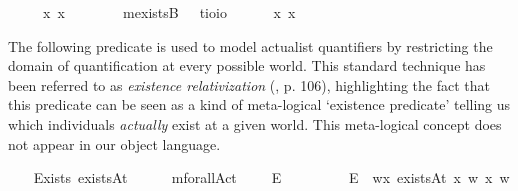 \begin{isabellebody}
\isanewline
\ \ \ \ \ {\isachardoublequoteopen}\isactrlbold {\isasymforall}x{\isachardot}\ {\isasymphi}{\isacharparenleft}x{\isacharparenright}\ {\isasymequiv}\ \isactrlbold {\isasymforall}{\isasymphi}{\isachardoublequoteclose}\ \ \isanewline
\ \ \isamarkupfalse%
\ mexistsB\ \ {\isacharcolon}{\isacharcolon}\ {\isachardoublequoteopen}{\isacharparenleft}{\isacharprime}t{\isasymRightarrow}io{\isacharparenright}{\isasymRightarrow}io{\isachardoublequoteclose}\ {\isacharparenleft}\isanewline
\ \ \ \ \ {\isachardoublequoteopen}\isactrlbold {\isasymexists}x{\isachardot}\ {\isasymphi}{\isacharparenleft}x{\isacharparenright}\ {\isasymequiv}\ \isactrlbold {\isasymexists}{\isasymphi}{\isachardoublequoteclose}%
\isamarkuptrue%
%
\begin{isamarkuptext}%
The following predicate is used to model actualist quantifiers by restricting the domain of quantification at every possible world.
This standard technique has been referred to as \emph{existence relativization} (\cite{fitting98}, p. 106),
highlighting the fact that this predicate can be seen as a kind of meta-logical `existence predicate' telling us
which individuals \emph{actually} exist at a given world. This meta-logical concept does not appear in our object language.%
\end{isamarkuptext}\isamarkuptrue%
\ \ \isamarkupfalse%
\ Exists{\isacharcolon}{\isacharcolon}{\isachardoublequoteopen}{\isasymup}{\isasymlangle}{\isasymzero}{\isasymrangle}{\isachardoublequoteclose}\ {\isacharparenleft}{\isachardoublequoteopen}existsAt{\isachardoublequoteclose}{\isacharparenright}\ \ \isanewline
\isanewline
\ \ \isamarkupfalse%
\ mforallAct\ \ \ {\isacharcolon}{\isacharcolon}\ {\isachardoublequoteopen}{\isasymup}{\isasymlangle}{\isasymup}{\isasymlangle}{\isasymzero}{\isasymrangle}{\isasymrangle}{\isachardoublequoteclose}\ {\isacharparenleft}{\isachardoublequoteopen}\isactrlbold {\isasymforall}\isactrlsup E{\isachardoublequoteclose}{\isacharparenright}\ \ \ \ \isanewline
\ \ \ \ \ {\isachardoublequoteopen}\isactrlbold {\isasymforall}\isactrlsup E{\isasymPhi}\ {\isasymequiv}\ {\isasymlambda}w{\isachardot}{\isasymforall}x{\isachardot}\ {\isacharparenleft}existsAt\ x\ w{\isacharparenright}{\isasymlongrightarrow}{\isacharparenleft}{\isasymPhi}\ x\ w{\isacharparenright}{\isachardoublequoteclose}\isanewline

\end{isabellebody}

